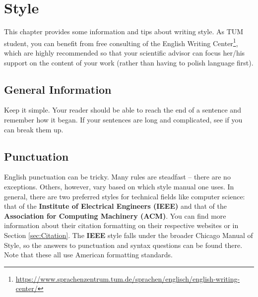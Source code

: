 \chapter{Style} \label{ch:Style}
This chapter provides some information and tips about writing style. 
As TUM student, you can benefit from free consulting of the English Writing Center\footnote{\url{https://www.sprachenzentrum.tum.de/sprachen/englisch/english-writing-center/}}, which are highly recommended so that your scientific advisor can focus her/his support on the content of your work (rather than having to polish language first).

\section{General Information}
Keep it simple. Your reader should be able to reach the end of a sentence and remember how it began. If your sentences are long and complicated, see if you can break them up. 

\section{Punctuation}
English punctuation can be tricky. Many rules are steadfast -- there are no exceptions. Others, however, vary based on which style manual one uses. In general, there are two preferred styles for technical fields like computer science: that of the \textbf{Institute of Electrical Engineers (IEEE)} and that of the \textbf{Association for Computing Machinery (ACM)}. You can find more information about their citation formatting on their respective websites or in Section \ref{sec:Citation}. The \textbf{IEEE} style falls under the broader Chicago Manual of Style, so the answers to punctuation and syntax questions can be found there. Note that these all use American formatting standards.

